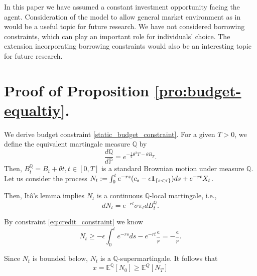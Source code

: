 \documentclass[a4paper,report, 11pt]{article}
\def\e{\epsilon}
\def\s{\sigma}
\def\t{\theta}
\begin{document}
 In this paper we have assumed a constant investment opportunity facing the agent. Consideration of the model to allow general market environment as in \citet{YKS} would be a useful topic for future research. We have not considered borrowing constraints, which can play an important role for individuals' choice. The extension incorporating borrowing constraints would also be an interesting topic for future research.
 
 
 




\appendix



\section{Proof of Proposition \ref{pro:budget-equaltiy}. }

 We derive budget constraint \eqref{static_budget_constraint}.
For a given $T>0$, we define the equivalent martingale measure $\mathbb{Q}$ by 
\begin{equation}\label{eq:measure-Q}
\dfrac{d \mathbb{Q}}{d \mathbb{P}}=e^{-\frac{1}{2}\t^2T - \t B_T}.
\end{equation}
Then, $B_t^{\mathbb{Q}}=B_t + \t t, t\in[0,T]$ is a standard Brownian motion under measure $\mathbb{Q}$.
Let us consider the process $N_t:= \int_0^t e^{-rs}(c_s- \e {\bf 1}_{\{s<\tau\}})ds +e^{-rt}X_t$.

Then, It\^o's lemma implies $N_t$ is a continuous $\mathbb{Q}$-local martingale, i.e.,
\begin{equation}
dN_t  =e^{-rt}\s\pi_t dB_t^{\mathbb{Q}}.
\end{equation}

By constraint \eqref{eq:credit_constraint} we know
$$
N_t \ge -\e \int_0^{t} e^{-rs} ds -e^{-rt} \frac{\e}{r}=-\dfrac{\e}{r}.
$$

Since $N_t$ is bounded below, $N_t$ is a $\mathbb{Q}$-supermartingale. It follows that 
\begin{equation}
x=\mathbb{E}^{\mathbb{Q}}[N_0]\ge \mathbb{E}^{Q}[N_T]
\end{equation}
\end{document}
